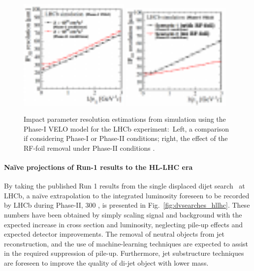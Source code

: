 \begin{figure}[t]
\centerline{
\includegraphics[width=0.48\textwidth]{figures/velo_ph21.pdf}
\includegraphics[width=0.48\textwidth]{figures/velo_ph22.pdf}
}
  \caption{Impact parameter resolution estimations from simulation using the Phase-I VELO model for the LHCb experiment:~Left, a comparison if considering Phase-I or Phase-II conditions; right, the effect of the RF-foil removal under Phase-II conditions \cite{Aaij:2244311}.}
  \label{fig:veloip_hllhc}
\end{figure}

\paragraph{Na\"ive projections of Run-1 results to the HL-LHC era}

By taking the published Run 1 results from the single displaced dijet search~\cite{Aaij:2017mic} at LHCb, a na\"ive extrapolation to the integrated luminosity foreseen to be recorded by LHCb during Phase-II, 300 \invfb, is presented in Fig.~\ref{fig:dvsearches_hllhc}. These numbers have been obtained by simply scaling signal and background with the expected increase in cross section and luminosity, neglecting pile-up effects and expected detector improvements.
The removal of neutral objects from jet reconstruction, and the use of machine-learning techniques are expected to assist in the required suppression of pile-up. Furthermore, jet substructure techniques are foreseen to improve the quality of di-jet object with lower mass.



